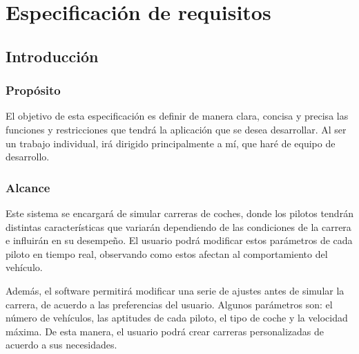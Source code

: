 

\chapter{Especificación de requisitos}

\section{Introducción}

\subsection{Propósito}
El objetivo de esta especificación es definir de manera clara, concisa y precisa las funciones y restricciones que tendrá la aplicación que se desea desarrollar. Al ser un trabajo individual, irá dirigido principalmente a mí, que haré de equipo de desarrollo.

\subsection{Alcance}

Este sistema se encargará de simular carreras de coches, donde los pilotos tendrán distintas características que variarán dependiendo de las condiciones de la carrera e influirán en su desempeño. El usuario podrá modificar estos parámetros de cada piloto en tiempo real, observando como estos afectan al comportamiento del vehículo.

\bigskip

Además, el software permitirá modificar una serie de ajustes antes de simular la carrera, de acuerdo a las preferencias del usuario. Algunos parámetros son: el número de vehículos, las aptitudes de cada piloto, el tipo de coche y la velocidad máxima. De esta manera, el usuario podrá crear carreras personalizadas de acuerdo a sus necesidades.

